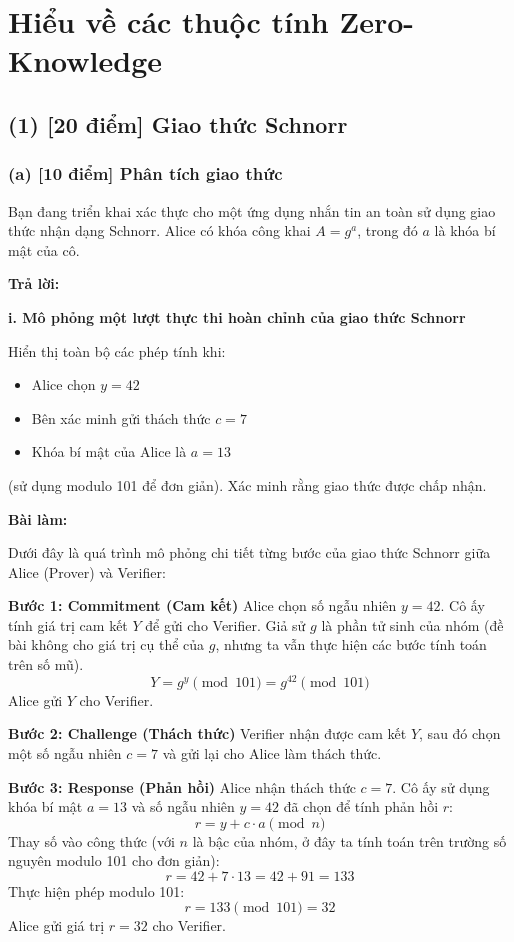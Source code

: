\section{Hiểu về các thuộc tính Zero-Knowledge}

\subsection{(1) [20 điểm] Giao thức Schnorr}

\subsubsection{(a) [10 điểm] Phân tích giao thức}

Bạn đang triển khai xác thực cho một ứng dụng nhắn tin an toàn sử dụng giao thức nhận dạng Schnorr.
Alice có khóa công khai $A = g^a$, trong đó $a$ là khóa bí mật của cô.

\begin{center}
    \textbf{Trả lời:}
\end{center}

\textbf{i. Mô phỏng một lượt thực thi hoàn chỉnh của giao thức Schnorr}

Hiển thị toàn bộ các phép tính khi:
\begin{itemize}
    \item Alice chọn $y = 42$
    \item Bên xác minh gửi thách thức $c = 7$
    \item Khóa bí mật của Alice là $a = 13$
\end{itemize}
(sử dụng modulo 101 để đơn giản).
Xác minh rằng giao thức được chấp nhận.

\textbf{Bài làm:}

Dưới đây là quá trình mô phỏng chi tiết từng bước của giao thức Schnorr giữa Alice (Prover) và Verifier:

\textbf{Bước 1: Commitment (Cam kết)}
Alice chọn số ngẫu nhiên $y = 42$. Cô ấy tính giá trị cam kết $Y$ để gửi cho Verifier.
Giả sử $g$ là phần tử sinh của nhóm (đề bài không cho giá trị cụ thể của $g$, nhưng ta vẫn thực hiện các bước tính toán trên số mũ).
\[
Y = g^y \pmod{101} = g^{42} \pmod{101}
\]
Alice gửi $Y$ cho Verifier.

\textbf{Bước 2: Challenge (Thách thức)}
Verifier nhận được cam kết $Y$, sau đó chọn một số ngẫu nhiên $c = 7$ và gửi lại cho Alice làm thách thức.

\textbf{Bước 3: Response (Phản hồi)}
Alice nhận thách thức $c = 7$. Cô ấy sử dụng khóa bí mật $a = 13$ và số ngẫu nhiên $y = 42$ đã chọn để tính phản hồi $r$:
\[
r = y + c \cdot a \pmod{n}
\]
Thay số vào công thức (với $n$ là bậc của nhóm, ở đây ta tính toán trên trường số nguyên modulo 101 cho đơn giản):
\[
r = 42 + 7 \cdot 13 = 42 + 91 = 133
\]
Thực hiện phép modulo 101:
\[
r = 133 \pmod{101} = 32
\]
Alice gửi giá trị $r = 32$ cho Verifier.

